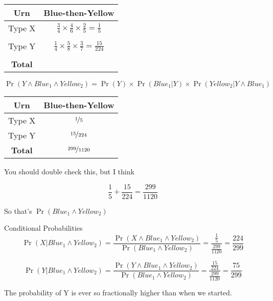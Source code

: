 \documentclass[
  ignorenonframetext,
]{beamer}
\renewcommand{\,}{\text{, }}
\begin{document}
\begin{frame}
\begin{longtable}[]{@{}cc@{}}
\toprule
Urn & Blue-then-Yellow \\
\midrule
\endhead
Type X &
\(\frac{3}{4} \times \frac{4}{6} \times \frac{2}{5} = \frac{1}{5}\) \\
& \\
Type Y &
\(\frac{1}{4} \times \frac{5}{8} \times \frac{3}{7} = \frac{15}{224}\) \\
& \\
\textbf{Total} & \\
\bottomrule
\end{longtable}

\[
\Pr(Y \wedge Blue_1 \wedge Yellow_2) = \Pr(Y) \times \Pr(Blue_1 | Y) \times \Pr(Yellow_2 | Y \wedge Blue_1)
\]
\end{frame}

\begin{frame}
\begin{longtable}[]{@{}cc@{}}
\toprule
Urn & Blue-then-Yellow \\
\midrule
\endhead
Type X & \(\nicefrac{1}{5}\) \\
Type Y & \(\nicefrac{15}{224}\) \\
\textbf{Total} & \(\nicefrac{299}{1120}\) \\
\bottomrule
\end{longtable}

You should double check this, but I think

\[
\frac{1}{5} + \frac{15}{224} = \frac{299}{1120}
\]

\bigskip

So that's \(\Pr(Blue_1 \wedge Yellow_2)\)
\end{frame}

\begin{frame}{Conditional Probabilities}
\protect\hypertarget{conditional-probabilities}{}
\[
\Pr(X | Blue_1 \wedge Yellow_2) = \frac{\Pr(X \wedge Blue_1 \wedge Yellow_2)}{\Pr(Blue_1 \wedge Yellow_2)} = \frac{\frac{1}{5}}{\frac{299}{1120}} = \frac{224}{299}
\]

\[
\Pr(Y | Blue_1 \wedge Yellow_2) = \frac{\Pr(Y \wedge Blue_1 \wedge Yellow_2)}{\Pr(Blue_1 \wedge Yellow_2)} = \frac{\frac{15}{224}}{\frac{299}{1120}} = \frac{75}{299}
\]

The probability of Y is ever so fractionally higher than when we
started.
\end{frame}
\end{document}
